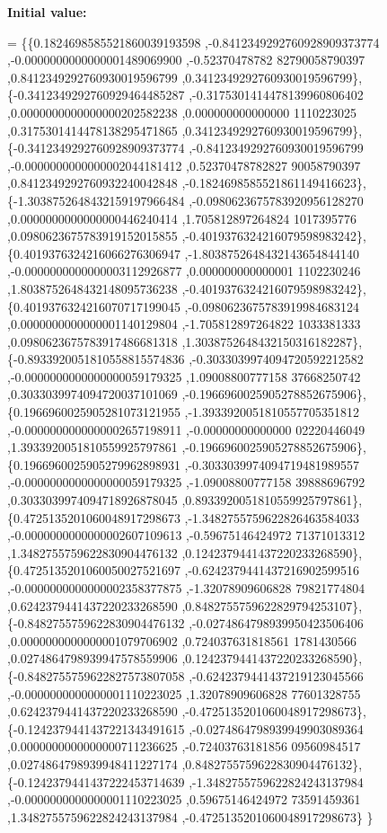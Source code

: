 {\bfseries Initial value\+:}
\begin{DoxyCode}
= \{\{0.1824698585521860039193598 ,-0.8412349292760928909373774 ,-0.0000000000000001489069900 ,-0.52370478782
      82790058790397 ,0.8412349292760930019596799 ,0.3412349292760930019596799\},
\{-0.3412349292760929464485287 ,-0.3175301414478139960806402 ,0.0000000000000000202582238 ,0.000000000000000
      1110223025 ,0.3175301414478138295471865 ,0.3412349292760930019596799\},
\{-0.3412349292760928909373774 ,-0.8412349292760930019596799 ,-0.0000000000000002044181412 ,0.52370478782827
      90058790397 ,0.8412349292760932240042848 ,-0.1824698585521861149416623\},
\{-1.3038752648432159197966484 ,-0.0980623675783920956128270 ,0.0000000000000000446240414 ,1.705812897264824
      1017395776 ,0.0980623675783919152015855 ,-0.4019376324216079598983242\},
\{0.4019376324216066276306947 ,-1.8038752648432143654844140 ,-0.0000000000000003112926877 ,0.000000000000001
      1102230246 ,1.8038752648432148095736238 ,-0.4019376324216079598983242\},
\{0.4019376324216070717199045 ,-0.0980623675783919984683124 ,0.0000000000000001140129804 ,-1.705812897264822
      1033381333 ,0.0980623675783917486681318 ,1.3038752648432150316182287\},
\{-0.8933920051810558815574836 ,-0.3033039974094720592212582 ,-0.0000000000000000059179325 ,1.09008800777158
      37668250742 ,0.3033039974094720037101069 ,-0.1966960025905278852675906\},
\{0.1966960025905281073121955 ,-1.3933920051810557705351812 ,-0.0000000000000002657198911 ,-0.00000000000000
      02220446049 ,1.3933920051810559925797861 ,-0.1966960025905278852675906\},
\{0.1966960025905279962898931 ,-0.3033039974094719481989557 ,-0.0000000000000000059179325 ,-1.09008800777158
      39888696792 ,0.3033039974094718926878045 ,0.8933920051810559925797861\},
\{0.4725135201060048917298673 ,-1.3482755759622826463584033 ,-0.0000000000000002607109613 ,-0.59675146424972
      71371013312 ,1.3482755759622830904476132 ,0.1242379441437220233268590\},
\{0.4725135201060050027521697 ,-0.6242379441437216902599516 ,-0.0000000000000002358377875 ,-1.32078909606828
      79821774804 ,0.6242379441437220233268590 ,0.8482755759622829794253107\},
\{-0.8482755759622830904476132 ,-0.0274864798939950423506406 ,0.0000000000000001079706902 ,0.724037631818561
      1781430566 ,0.0274864798939947578559906 ,0.1242379441437220233268590\},
\{-0.8482755759622827573807058 ,-0.6242379441437219123045566 ,-0.0000000000000001110223025 ,1.32078909606828
      77601328755 ,0.6242379441437220233268590 ,-0.4725135201060048917298673\},
\{-0.1242379441437221343491615 ,-0.0274864798939949903089364 ,0.0000000000000000711236625 ,-0.72403763181856
      09560984517 ,0.0274864798939948411227174 ,0.8482755759622830904476132\},
\{-0.1242379441437222453714639 ,-1.3482755759622824243137984 ,-0.0000000000000001110223025 ,0.59675146424972
      73591459361 ,1.3482755759622824243137984 ,-0.4725135201060048917298673\}
\}
\end{DoxyCode}
\mbox{\label{a00449_a473896cbb6a7d08a5a195050cf00d8eb}} 
